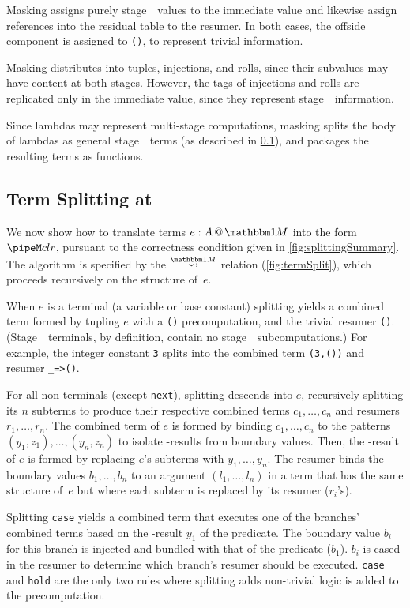 \begin{abstrsyn}
Masking assigns purely stage~\bbone\ values to the immediate value
and likewise assign references into the residual table to the resumer.
In both cases, the offside component is assigned to \texttt{()}, to represent trivial information.

Masking distributes into tuples, injections, and rolls, since their subvalues may have content at both stages.
However, the tags of injections and rolls are replicated only in the immediate value, 
since they represent stage~\bbone\ information.

Since lambdas may represent multi-stage computations, 
masking splits the body of lambdas as general stage~\bbone\ terms (as described in \ref{sec:split-one}), 
and packages the resulting terms as functions.

\subsection{Term Splitting at \bbonem}
\label{sec:split-one}

We now show how to translate terms $\colmix e A$ into the form $\pipeM c l r$,
pursuant to the correctness condition given in \ref{fig:splittingSummary}.
The algorithm is specified by the $\splitonesym$ relation (\cref{fig:termSplit}), 
which proceeds recursively on the structure of~$e$.

When $e$ is a terminal (a variable or base constant)
splitting yields a combined term formed by tupling $e$ with a \texttt{()} precomputation, 
and the trivial resumer \texttt{()}. 
(Stage~\bbone\ terminals, by definition, contain no stage~\bbtwo\ subcomputations.)  
For example, the integer constant \texttt{3} splits into the combined term \texttt{(3,())} and resumer \texttt{\_=>()}.

For all non-terminals (except \texttt{next}),
splitting descends into $e$, recursively splitting its $n$ subterms
to produce their respective combined terms $c_1,\ldots,c_n$ and resumers $r_1, \ldots, r_n$.
The combined term of $e$ is formed by binding $c_1,\ldots,c_n$
to the patterns $(y_1,z_1),\ldots,(y_n,z_n)$
to isolate \bbone-results from boundary values. Then,
the \bbone-result of $e$ is formed by replacing $e$'s subterms with $y_1,\ldots,y_n$.
The resumer binds the boundary values $b_1,\ldots,b_n$ to an
argument $(l_1,\ldots,l_n)$ in a term that has the same structure
of~$e$ but where each subterm is replaced by its resumer ($r_i$'s).

Splitting {\tt case} yields a combined term that executes one of the branches' combined terms based on the \bbone-result $y_1$ of the predicate.
The boundary value $b_i$ for this branch is injected and bundled with that of the predicate ($b_1$).   
$b_i$ is cased in the resumer to determine which branch's resumer should be executed.
{\tt case} and \texttt{hold} are the only two rules where splitting adds non-trivial logic is added to the precomputation.


\end{abstrsyn}
